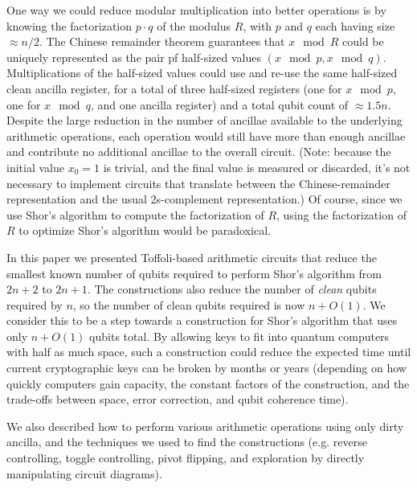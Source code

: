 \documentclass[twocolumn]{article}
\begin{document}
One way we could reduce modular multiplication into better operations is by knowing the factorization $p \cdot q$ of the modulus $R$, with $p$ and $q$ each having size $\approx n/2$.
The Chinese remainder theorem guarantees that $x \mod R$ could be uniquely represented as the pair pf half-sized values $(x \mod p, x \mod q)$.
Multiplications of the half-sized values could use and re-use the same half-sized clean ancilla register, for a total of three half-sized registers (one for $x \mod p$, one for $x \mod q$, and one ancilla register) and a total qubit count of $\approx 1.5n$.
Despite the large reduction in the number of ancillae available to the underlying arithmetic operations, each operation would still have more than enough ancillae and contribute no additional ancillae to the overall circuit.
(Note: because the initial value $x_0 = 1$ is trivial, and the final value is measured or discarded, it's not necessary to implement circuits that translate between the Chinese-remainder representation and the usual 2s-complement representation.)
Of course, since we use Shor's algorithm to compute the factorization of $R$, using the factorization of $R$ to optimize Shor's algorithm would be paradoxical.

In this paper we presented Toffoli-based arithmetic circuits that reduce the smallest known number of qubits required to perform Shor's algorithm from $2n+2$ to $2n+1$.
The constructions also reduce the number of {\em clean} qubits required by $n$, so the number of clean qubits required is now $n + O(1)$.
We consider this to be a step towards a construction for Shor's algorithm that uses only $n + O(1)$ qubits total.
By allowing keys to fit into quantum computers with half as much space, such a construction could reduce the expected time until current cryptographic keys can be broken by months or years (depending on how quickly computers gain capacity, the constant factors of the construction, and the trade-offs between space, error correction, and qubit coherence time).

We also described how to perform various arithmetic operations using only dirty ancilla, and the techniques we used to find the constructions (e.g. reverse controlling, toggle controlling, pivot flipping, and exploration by directly manipulating circuit diagrams).




\end{document}

